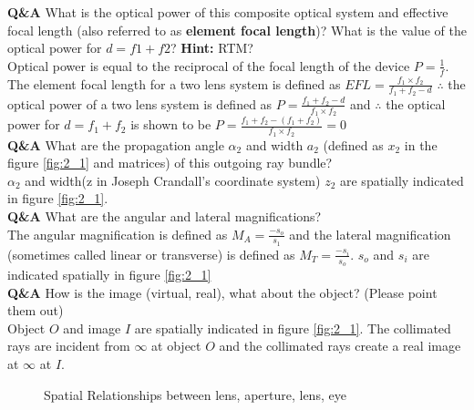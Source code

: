 \documentclass[main.tex]{subfiles}
\begin{document}
\newpage

\textbf{Q\&A} What is the optical power of this composite optical system and effective focal length (also referred to as \textbf{element focal length})? What is the value of the optical power for $d=f1+f2$? \textbf{Hint:} RTM?\\

Optical power is equal to the reciprocal of the focal length of the device $P=\frac{1}{f}$. The element focal length for a two lens system is defined as $EFL = \frac{f_1 \times f_2}{f_1 + f_2 - d}$ $\therefore$ the optical power of a two lens system is defined as $P=\frac{f_1 + f_2 -d}{f_1 \times f_2}$ and $\therefore$ the optical power for $d=f_1 + f_2$ is shown to be $P=\frac{f_1 + f_2 - (f_1 + f_2)}{f_1 \times f_2} = 0$\\

\textbf{Q\&A} What are the propagation angle $\alpha_2$ and width $a_2$ (defined as $x_2$ in the figure \ref{fig:2_1} and matrices) of this outgoing ray bundle? \\

$\alpha_2$ and width(z in Joseph Crandall's coordinate system) $z_2$ are spatially indicated in figure \ref{fig:2_1}.\\

\textbf{Q\&A} What are the angular and lateral magnifications?\\

The angular magnification is defined as $M_A = \frac{-s_o}{s_1}$ and the lateral magnification (sometimes called linear or transverse) is defined as $M_T = \frac{-s_i}{s_o}$. $s_o$ and $s_i$ are indicated spatially in figure \ref{fig:2_1}\\

\textbf{Q\&A} How is the image (virtual, real), what about the object? (Please point them out)\\

Object $O$ and image $I$ are spatially indicated in figure \ref{fig:2_1}. The collimated rays are incident from $\infty$ at object $O$ and the collimated rays create a real image at $\infty$ at $I$. 


\newpage

\begin{figure}
\centering{}
\caption{Spatial Relationships between lens, aperture, lens, eye}
\label{fig:2_2}
\end{figure}
\end{document}
